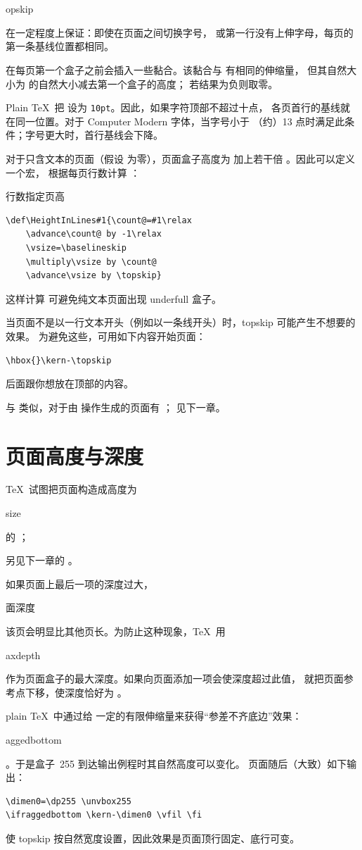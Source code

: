 \documentclass[a4paper]{rapport3}
\makeatletter
\def\alt{}\def\altt{}%
\def\term#1\par{\index{#1}}
\def\howto#1\par{}
\def\cstoidx#1\par{\index{#1@\cs{#1}}}
\def\csidx#1{\cstoidx #1\par\cs{#1}}
\makeatother
\begin{document}
\section{\protect{}}

\csidx{topskip} 在一定程度上保证：即使在页面之间切换字号，
或第一行没有上伸字母，每页的第一条基线位置都相同。

在每页第一个盒子之前会插入一些黏合。该黏合与  有相同的伸缩量，
但其自然大小为  的自然大小减去第一个盒子的高度；
若结果为负则取零。

Plain \TeX\ 把  设为 {\tt 10pt}。因此，如果字符顶部不超过十点，
各页首行的基线就在同一位置。对于 Computer Modern 字体，当字号小于
（约）13 点时满足此条件；字号更大时，首行基线会下降。

对于只含文本的页面（假设  为零），页面盒子高度为
 加上若干倍 。因此可以定义一个宏，
根据每页行数计算 ：
\howto 按行数指定页高\par
\begin{verbatim}
\def\HeightInLines#1{\count@=#1\relax
    \advance\count@ by -1\relax
    \vsize=\baselineskip
    \multiply\vsize by \count@
    \advance\vsize by \topskip}
\end{verbatim}
这样计算  可避免纯文本页面出现 underfull 盒子。

当页面不是以一行文本开头（例如以一条线开头）时，topskip 可能产生不想要的效果。
为避免这些，可用如下内容开始页面：
\begin{verbatim}
\hbox{}\kern-\topskip
\end{verbatim}
后面跟你想放在顶部的内容。

与  类似，对于由  操作生成的页面有 ；
见下一章。

\section{页面高度与深度}

\TeX\ 试图把页面构造成高度为 \csidx{vsize} 的 ；
\alt
另见下一章的 。

如果页面上最后一项的深度过大，
\term 页面深度\par
该页会明显比其他页长。为防止这种现象，\TeX\ 用 \csidx{maxdepth}
作为页面盒子的最大深度。如果向页面添加一项会使深度超过此值，
就把页面参考点下移，使深度恰好为 。

plain \TeX\ 中通过给  一定的有限伸缩量来获得“参差不齐底边”效果：
\cstoidx raggedbottom\par
\hbox{}。于是盒子~255 到达输出例程时其自然高度可以变化。
页面随后（大致）如下输出：
\begin{verbatim}
\dimen0=\dp255 \unvbox255
\ifraggedbottom \kern-\dimen0 \vfil \fi 
\end{verbatim}
 使 topskip 按自然宽度设置，因此效果是页面顶行固定、底行可变。
\end{document}
